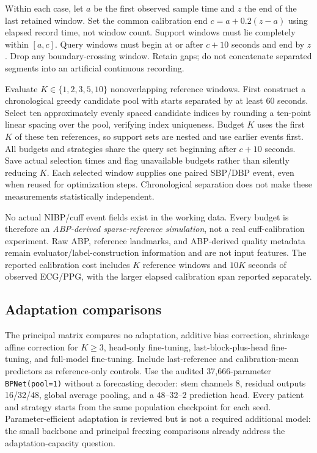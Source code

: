 \documentclass[11pt]{article}
\begin{document}
Within each case, let $a$ be the first observed sample time and $z$ the end of the last retained window. Set the common calibration end $c=a+0.2(z-a)$ using elapsed record time, not window count. Support windows must lie completely within $[a,c]$. Query windows must begin at or after $c+10$ seconds and end by $z$. Drop any boundary-crossing window. Retain gaps; do not concatenate separated segments into an artificial continuous recording.

Evaluate $K\in\{1,2,3,5,10\}$ nonoverlapping reference windows. First construct a chronological greedy candidate pool with starts separated by at least 60 seconds. Select ten approximately evenly spaced candidate indices by rounding a ten-point linear spacing over the pool, verifying index uniqueness. Budget $K$ uses the first $K$ of these ten references, so support sets are nested and use earlier events first. All budgets and strategies share the query set beginning after $c+10$ seconds. Save actual selection times and flag unavailable budgets rather than silently reducing $K$. Each selected window supplies one paired SBP/DBP event, even when reused for optimization steps. Chronological separation does not make these measurements statistically independent.

No actual NIBP/cuff event fields exist in the working data. Every budget is therefore an \emph{ABP-derived sparse-reference simulation}, not a real cuff-calibration experiment. Raw ABP, reference landmarks, and ABP-derived quality metadata remain evaluator/label-construction information and are not input features. The reported calibration cost includes $K$ reference windows and $10K$ seconds of observed ECG/PPG, with the larger elapsed calibration span reported separately.

\subsection{Adaptation comparisons}
The principal matrix compares no adaptation, additive bias correction, shrinkage affine correction for $K\geq3$, head-only fine-tuning, last-block-plus-head fine-tuning, and full-model fine-tuning. Include last-reference and calibration-mean predictors as reference-only controls. Use the audited 37,666-parameter \texttt{BPNet(pool=1)} without a forecasting decoder: stem channels 8, residual outputs 16/32/48, global average pooling, and a 48--32--2 prediction head. Every patient and strategy starts from the same population checkpoint for each seed. Parameter-efficient adaptation is reviewed but is not a required additional model: the small backbone and principal freezing comparisons already address the adaptation-capacity question.
\end{document}
